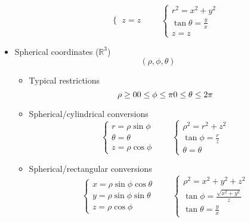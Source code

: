 \begin{itemize}
\begin{itemize}
\begin{equation}
\begin{cases}
							z = z
						\end{cases} \qquad \begin{cases}
							r^2 = x^2 + y^2 \\
							\tan \theta = \frac{y}{x} \\
							z = z
						\end{cases}
					\end{equation}
			\end{itemize}
		\item Spherical coordinates ($\mathbb{R}^3$)
			\begin{equation}
				(\rho, \phi, \theta)
			\end{equation}
			\begin{itemize}
				\item Typical restrictions
					\begin{equation}
						\rho \geq 0 \\
						0 \leq \phi \leq \pi \\
						0 \leq \theta \leq 2 \pi
					\end{equation}
				\item Spherical/cylindrical conversions
					\begin{equation}
						\begin{cases}
							r = \rho \sin \phi \\
							\theta = \theta \\
							z = \rho \cos \phi
						\end{cases} \qquad \begin{cases}
							\rho^2 = r^2 + z^2 \\
							\tan \phi = \frac{r}{z} \\
							\theta = \theta
						\end{cases}
					\end{equation}
				\item Spherical/rectangular conversions
					\begin{equation}
						\begin{cases}
							x = \rho \sin \phi \cos \theta \\
							y = \rho \sin \phi \sin \theta \\
							z = \rho \cos \phi
						\end{cases} \qquad \begin{cases}
							\rho^2 = x^2 + y^2 + z^2 \\
							\tan \phi = \frac{\sqrt{x^2+y^2}}{z} \\
							\tan \theta = \frac{y}{x}
						\end{cases}
					\end{equation}
			\end{itemize}
	\end{itemize}
